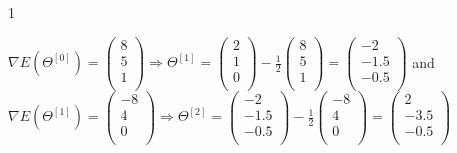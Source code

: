 \documentclass{article}
\begin{document}
\begin{ukon-infie}[12.11.17]{1}
\begin{exercise}[p=10]{}
$\nabla E(\Theta^{[0]}) = 
\left( \begin{array}{c}
8\\
5\\
1\\
\end{array}\right) \Rightarrow \Theta^{[1]} = 
\left( \begin{array}{c}
2\\
1\\
0\\
\end{array} \right)
- \frac{1}{2}
\left( \begin{array}{c}
8\\
5\\
1\\
\end{array} \right) = 
\left( \begin{array}{c}
-2\\
-1.5\\
-0.5\\
\end{array} \right)
$ and\\ 
$\nabla E(\Theta^{[1]}) = 
\left( \begin{array}{c}
-8\\
4\\
0\\
\end{array}\right) \Rightarrow \Theta^{[2]} = 
\left( \begin{array}{c}
-2\\
-1.5\\
-0.5\\
\end{array} \right)
- \frac{1}{2}
\left( \begin{array}{c}
-8\\
4\\
0\\
\end{array} \right) = 
\left( \begin{array}{c}
2\\
-3.5\\
-0.5\\
\end{array} \right)$


		\end{exercise}
		

\end{ukon-infie}
\end{document}
